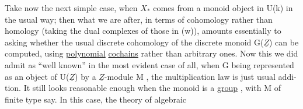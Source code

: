 Take now the next simple case,  when $X_*$  comes from a monoid object
in U(k) in the usual way;  then what we are after,  in  terms of cohomology
rather than homology (taking the dual complexes of those in (w)), amounts
essentially to asking whether the usual  discrete cohomology of the
discrete  monoid  G($\underline{Z}$)  can be computed,  using \uline{polynomial} \uline{cochains}
rather than arbitrary ones.  Now this we did admit as ``well known'' in
the most evident case of all,  when G being represented  as an object
of U($\underline{Z}$)  by a  $\underline{Z}$-module M ,  the multiplication law is just  usual addi-%
tion.  It still looks reasonable enough when the monoid  is a \uline{group} ,
with M of finite type say.  In this case,  the  theory of algebraic
